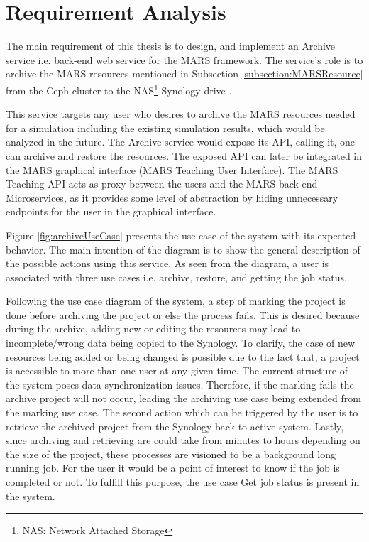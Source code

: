\newpage
\chapter{Requirement Analysis}
 The main requirement of this thesis is to design, and implement an Archive service i.e. back-end web service for the MARS framework. The service's role is to
 archive the MARS resources mentioned in Subsection \ref{subsection:MARSResource} from the Ceph cluster \cite{Ceph} to the 
 NAS\footnote{NAS: Network Attached Storage} Synology drive \cite{Synology}.

 This service targets any user who desires to archive the MARS resources needed for a simulation including the existing simulation results, which would
 be analyzed in the future. The Archive service would expose its API, calling it, one can archive and restore the resources. The exposed
 API can later be integrated in the MARS graphical interface (MARS Teaching User Interface). The MARS Teaching API acts as proxy between the users 
 and the MARS back-end Microservices, as it provides some level of abstraction by hiding unnecessary endpoints for the user in the graphical interface.

 Figure \ref{fig:archiveUseCase} presents the use case of the system with its expected behavior. The main intention of the diagram is to show the
 general description of the possible actions using this service. As seen from the diagram, a user is associated with three use cases i.e. archive, restore,
 and getting the job status. 

 Following the use case diagram of the system, a step of marking the project is done before archiving the project or else the process fails. This is desired because 
 during the archive, adding new or editing the resources may lead to incomplete/wrong data being copied to the Synology. To clarify, the case of new resources being
 added or being changed is possible due to the fact that, a project is accessible to more than one user at any given time. The current structure of the system
 poses data synchronization issues. Therefore, if the marking fails the archive project will not occur, leading the archiving use case being extended from the marking
 use case. The second action which can be triggered by the user is to retrieve the archived project from the Synology back to active system. Lastly, since archiving 
 and retrieving are could take from minutes to hours depending on the size of the project, these processes are visioned to be a background long running job. For the user
 it would be a point of interest to know if the job is completed or not. To fulfill this purpose, the use case Get job status is present in the system.
 
